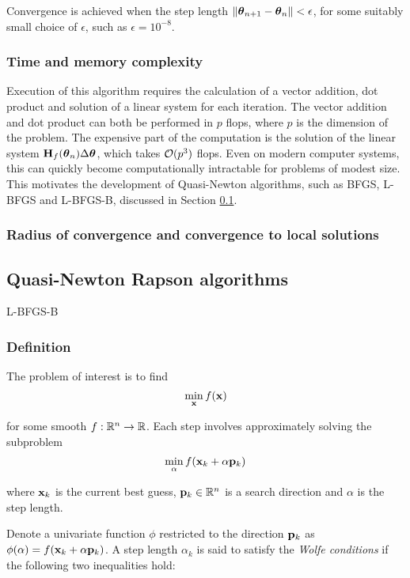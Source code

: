 \documentclass{amsart}[12pt]
\begin{document}
Convergence is achieved when the step length $\| {\boldsymbol \theta}_{n+1} - {\boldsymbol \theta}_{n} \| < \epsilon$, for some
suitably small choice of $\epsilon$, such as $\epsilon = 10^{-8}$.

\subsubsection{Time and memory complexity}

Execution of this algorithm requires the calculation of a vector addition, dot product and solution of a
linear system for each iteration. The vector addition and dot product can both be performed in $p$ flops,
where $p$ is the dimension of the problem. The expensive part of the computation is the solution of the linear
system ${\bf H}_f({\boldsymbol \theta}_n) \Delta {\boldsymbol\theta}$, which takes ${\mathcal O}(p^3)$ flops. Even on modern computer systems, this
can quickly become computationally intractable for problems of modest size. This motivates the development
of Quasi-Newton algorithms, such as BFGS, L-BFGS and L-BFGS-B, discussed in Section \ref{sec:quasi_newton}.

\subsubsection{Radius of convergence and convergence to local solutions}

\subsection{Quasi-Newton Rapson algorithms}
\label{sec:quasi_newton}
L-BFGS-B

\subsubsection{Definition}

The problem of interest is to find
\[
	\min_{\bf x} f({\bf x})
\]

for some smooth $f: {\mathbb{R}}^n \to {\mathbb{R}}$. Each step involves approximately solving the subproblem
\[
	\min_\alpha f({\bf x}_k + \alpha {\bf p}_k)
\]

where ${\bf x}_k$ is the current best guess, ${\bf p}_k \in {\mathbb{R}}^n$ is a search direction and $\alpha$ is the
step length.

Denote a univariate function $\phi$ restricted to the direction ${\bf p}_k$ as
$\phi(\alpha) = f({\bf x}_k + \alpha {\bf p}_k)$. A step length $\alpha_k$ is said to satisfy the \emph{Wolfe conditions}
if the following two inequalities hold:
\end{document}

